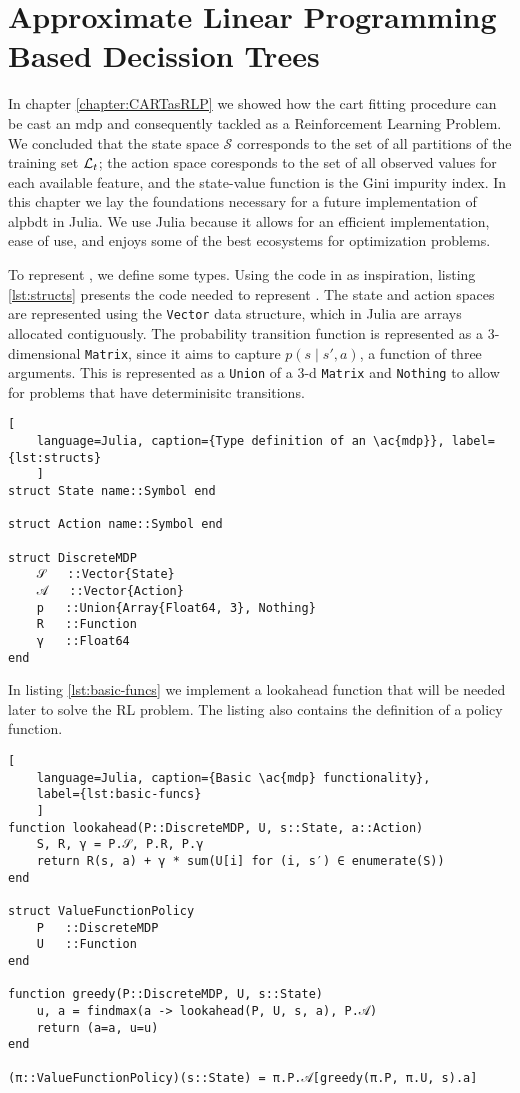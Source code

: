 \chapter{Approximate Linear Programming Based Decission Trees}
\label{chapter:ALPBDT}

In chapter \ref{chapter:CARTasRLP} we showed how the \ac{cart} fitting procedure
can be cast an \ac{mdp} and consequently tackled as a Reinforcement Learning
Problem. We concluded that the state space $\mathcal{S}$ corresponds to the set
of all partitions of the training set $\mathcal{L}_t$; the action space coresponds to the
set of all observed values for each available feature, and the state-value
function is the Gini impurity index. In this chapter we lay the foundations
necessary for a future implementation of \acf{alpbdt} in Julia.  We use Julia
because it allows for an efficient implementation, ease of use, and enjoys some
of the best ecosystems for optimization problems.

To represent , we define some types. Using the code in
\cite{kochenderfer2022} as inspiration, listing \ref{lst:structs} presents the
code needed to represent . The state and action spaces are represented
using the \lstinline{Vector} data structure, which in Julia are arrays allocated
contiguously. The probability transition function is represented as a
3-dimensional \lstinline{Matrix}, since it aims to capture $p(s \mid s', a)$, a
function of three arguments. This is represented as a \lstinline{Union} of a 3-d
\lstinline{Matrix} and \lstinline{Nothing} to allow for problems that have
determinisitc transitions.

\begin{lstlisting}[
    language=Julia, caption={Type definition of an \ac{mdp}}, label={lst:structs}
    ]
struct State name::Symbol end

struct Action name::Symbol end

struct DiscreteMDP
    𝒮   ::Vector{State}
    𝒜   ::Vector{Action}
    p   ::Union{Array{Float64, 3}, Nothing}
    R   ::Function
    γ   ::Float64
end
\end{lstlisting}

In listing \ref{lst:basic-funcs} we implement a lookahead function that will be
needed later to solve the RL problem. The listing also contains the definition
of a policy function.

\begin{lstlisting}[
    language=Julia, caption={Basic \ac{mdp} functionality},
    label={lst:basic-funcs}
    ]
function lookahead(P::DiscreteMDP, U, s::State, a::Action)
    S, R, γ = P.𝒮, P.R, P.γ
    return R(s, a) + γ * sum(U[i] for (i, s′) ∈ enumerate(S))
end

struct ValueFunctionPolicy
    P   ::DiscreteMDP
    U   ::Function
end

function greedy(P::DiscreteMDP, U, s::State)
    u, a = findmax(a -> lookahead(P, U, s, a), P.𝒜)
    return (a=a, u=u)
end

(π::ValueFunctionPolicy)(s::State) = π.P.𝒜[greedy(π.P, π.U, s).a]
\end{lstlisting}

